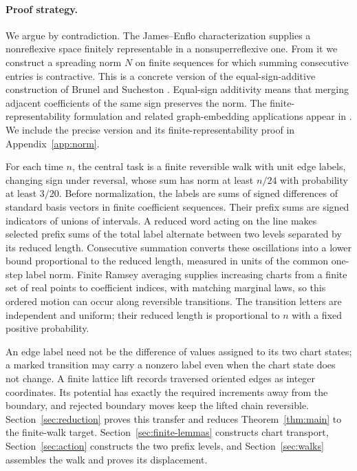 \documentclass[11pt]{article}
\theoremstyle{definition}
\theoremstyle{remark}
\begin{document}
\paragraph{Proof strategy.}
We argue by contradiction. The James--Enflo characterization supplies
a nonreflexive space finitely representable in a nonsuperreflexive one.
From it we construct a spreading norm $N$ on
finite sequences for which summing consecutive entries is contractive.
This is a concrete version of the equal-sign-additive construction of
Brunel and Sucheston
\cite{BrunelSucheston1974,BrunelSucheston1975,BrunelSucheston}.
Equal-sign additivity means that merging adjacent coefficients of the
same sign preserves the norm.
The finite-representability formulation and related graph-embedding
applications appear in \cite{Ostrovskii,OstrovskiiRandrianantoanina}.
We include the precise version and
its finite-representability proof in Appendix~\ref{app:norm}.

For each time $n$, the central task is a finite reversible walk with
unit edge labels, changing sign under reversal, whose sum has norm at
least $n/24$ with probability at least $3/20$. Before normalization,
the labels are sums of signed differences of standard basis vectors
in finite coefficient sequences. Their prefix sums are signed indicators
of unions of intervals. A reduced word acting on the
line makes selected prefix sums of the total label alternate between
two levels separated by its reduced length. Consecutive summation converts
these oscillations into a lower bound proportional to the reduced length,
measured in units of the common one-step label norm. Finite Ramsey averaging supplies
increasing charts from a finite set of real points to coefficient indices,
with matching marginal laws, so this
ordered motion can occur along reversible transitions.
The transition letters are independent and uniform; their reduced length
is proportional to $n$ with a fixed positive probability.

An edge label need not be the difference of values assigned to its two
chart states; a marked transition may carry a nonzero label even when
the chart state does not change. A finite lattice lift records traversed
oriented edges as
integer coordinates. Its potential has exactly the required increments
away from the boundary, and rejected boundary moves keep the lifted
chain reversible. Section~\ref{sec:reduction} proves this transfer and
reduces Theorem~\ref{thm:main} to the finite-walk target.
Section~\ref{sec:finite-lemmas} constructs chart transport,
Section~\ref{sec:action} constructs the two prefix levels, and
Section~\ref{sec:walks} assembles the walk and proves its displacement.
\end{document}
